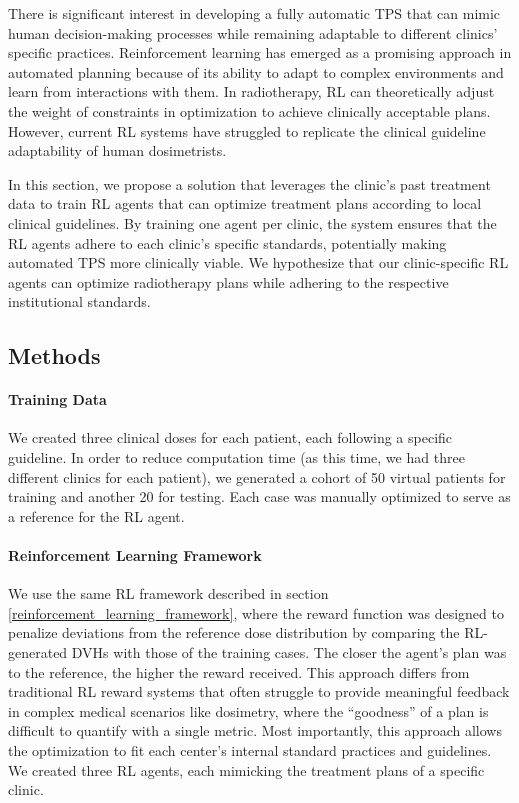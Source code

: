 There is significant interest in developing a fully automatic TPS that can mimic human decision-making processes while remaining adaptable to different clinics' specific practices.
Reinforcement learning has emerged as a promising approach in automated planning because of its ability to adapt to complex environments and learn from interactions with them.
In radiotherapy, RL can theoretically adjust the weight of constraints in optimization to achieve clinically acceptable plans.
However, current RL systems have struggled to replicate the clinical guideline adaptability of human dosimetrists.

In this section, we propose a solution that leverages the clinic's past treatment data to train RL agents that can optimize treatment plans according to local clinical guidelines.
By training one agent per clinic, the system ensures that the RL agents adhere to each clinic's specific standards, potentially making automated TPS more clinically viable.
We hypothesize that our clinic-specific RL agents can optimize radiotherapy plans while adhering to the respective institutional standards.

\subsection{Methods}
\paragraph{Training Data}
We created three clinical doses for each patient, each following a specific guideline.
In order to reduce computation time (as this time, we had three different clinics for each patient), we generated a cohort of 50 virtual patients for training and another 20 for testing.
Each case was manually optimized to serve as a reference for the RL agent.

\paragraph{Reinforcement Learning Framework}
We use the same RL framework described in section \ref{reinforcement_learning_framework}, where the reward function was designed to penalize deviations from the reference dose distribution by comparing the RL-generated DVHs with those of the training cases.
The closer the agent’s plan was to the reference, the higher the reward received.
This approach differs from traditional RL reward systems that often struggle to provide meaningful feedback in complex medical scenarios like dosimetry, where the “goodness” of a plan is difficult to quantify with a single metric.
Most importantly, this approach allows the optimization to fit each center’s internal standard practices and guidelines.
We created three RL agents, each mimicking the treatment plans of a specific clinic.

